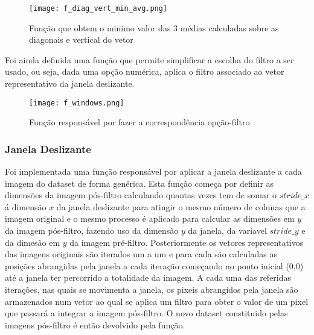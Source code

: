 	\begin{figure}[H]

	  \centering
	  \captionsetup{justification=centering}

	  \texttt{[image: f\_diag\_vert\_min\_avg.png]}
	  
	  \caption {Função que obtem o minimo valor das 3 médias calculadas sobre as diagonais e vertical do vetor}
	\end{figure}


Foi ainda definida uma função que permite simplificar a escolha do filtro a ser usado, ou seja, dada uma opção numérica, aplica o filtro associado ao vetor representativo da janela deslizante.

\begin{figure}[H]

  \centering
  \captionsetup{justification=centering}

  \texttt{[image: f\_windows.png]}
  
  \caption {Função responsável por fazer a correspondência opção-filtro}
\end{figure}


\subsubsection{Janela Deslizante}\hfill\newline
    \hfill\newline

	Foi implementada uma função responsável por aplicar a janela deslizante a cada imagem do dataset de forma genérica.\newline
	Esta função começa por definir as dimensões da imagem pós-filtro calculando quantas vezes tem de somar o $stride\_x$ á dimensão $x$ da janela deslizante para atingir o mesmo número de colunas que a imagem original e o mesmo processo é aplicado para calcular as dimensões em $y$ da imagem pós-filtro, fazendo uso da dimensão $y$ da janela, da variavel $stride\_y$ e da dimesão em $y$ da imagem pré-filtro\cite{ref8}.\newline
	Posteriormente os vetores representativos das imagens originais são iterados um a um e para cada são calculadas as posições abrangidas pela janela a cada iteração começando no ponto inicial (0,0) até a janela ter percorrido a totalidade da imagem. A cada uma das referidas iterações, nas quais se movimenta a janela, os pixeis abrangidos pela janela são armazenados num vetor ao qual se aplica um filtro para obter o valor de um pixel que passará a integrar a imagem pós-filtro.\newline
	O novo dataset constituido pelas imagens pós-filtro é então devolvido pela função.


